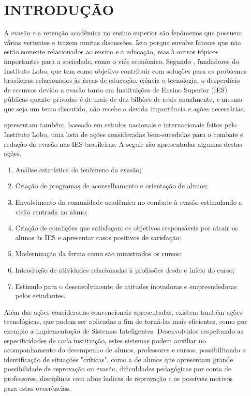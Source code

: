 \chapter{INTRODUÇÃO}
\label{chap:introducao}

A evasão e a retenção acadêmica no ensino superior são fenômenos que possuem várias vertentes e trazem muitas discussões. Isto porque envolve fatores que não estão somente relacionados ao ensino e a educação, mas à outros tópicos importantes para a sociedade, como o viés econômico. Segundo , fundadores do Instituto Lobo, que tem como objetivo contribuir com soluções para os problemas brasileiros relacionados às áreas de educação, ciência e tecnologia, o desperdício de recursos devido a evasão tanto em Instituições de Ensino Superior (IES) públicas quanto privadas é de mais de dez bilhões de reais anualmente, e mesmo que seja um tema discutido, não recebe a devida importância e ações necessárias.

 apresentam também, baseado em estudos nacionais e internacionais feitos pelo Instituto Lobo, uma lista de ações consideradas bem-sucedidas para o combate e redução da evasão nas IES brasileiras. A seguir são apresentadas algumas destas ações.

\begin{enumerate}
    \item Análise estatística do fenômeno da evasão;
    \item Criação de programas de aconselhamento e orientação de alunos;
    \item Envolvimento da comunidade acadêmica no combate à evasão estimulando a visão centrada no aluno;
    \item Criação de condições que satisfaçam os objetivos responsáveis por atrair os alunos às IES e apresentar casos positivos de satisfação;
    \item Modernização da forma como são ministrados os cursos:
    \item Introdução de atividades relacionadas à profissões desde o início do curso;
    \item Estímulo para o desenvolvimento de atitudes inovadoras e empreendedoras pelos estudantes.
\end{enumerate} 

Além das ações consideradas convencionais apresentadas, existem também ações tecnológicas, que podem ser aplicadas a fim de torná-las mais eficientes, como por exemplo a implementação de Sistemas Inteligentes. 
Desenvolvidos respeitando as especificidades de cada instituição, estes sistemas podem auxiliar no acompanhamento do desempenho de alunos, professores e cursos, possibilitando a identificação de situações "críticas", como a de alunos que apresentam grande possibilidade de reprovação ou evasão, dificuldades pedagógicas por conta de professores, disciplinas com altos índices de reprovação e os possíveis motivos para estas ocorrências.

